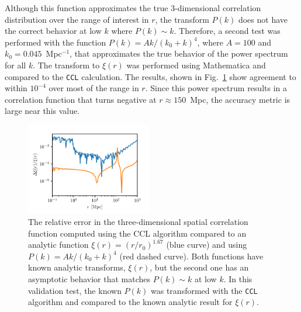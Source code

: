 \documentclass[\docopts]{\docclass}
\newcommand{\ccl}{{\tt CCL}\xspace}
\begin{document}
Although this function approximates the true 3-dimensional correlation distribution over the range of interest in $r$, the transform $P(k)$ does not have the correct behavior at low $k$ where $P(k) \sim  k$. Therefore, a second test was performed with the function $P(k) = A k / (k_0 + k)^4$, where $A = 100$ and $k_0 = 0.045$~Mpc$^{-1}$, that approximates the true behavior of the power spectrum for all $k$.
The transform to $\xi(r)$ was performed using Mathematica and compared to the \ccl calculation. The results, shown in Fig.~\ref{fig:analytic_xi} show agreement to within $10^{-4}$ over most of the range in $r$. Since this power spectrum results in a correlation function that turns negative at $r \approx 150$~Mpc, the accuracy metric is large near this value. 


%
\begin{figure}[htbp]
\centering
\includegraphics[width=0.49\textwidth]{3dcorr_analytic}
\caption{The relative error in the three-dimensional spatial correlation function computed using the CCL algorithm compared to an analytic function $\xi(r) = (r/r_0)^{1.67}$ (blue curve) and using $P(k) = A k / (k_0 + k)^4$ (red dashed curve). Both functions have known analytic transforms, $\xi(r)$, but the second one has an asymptotic behavior that matches $P(k)\sim k$ at low $k$. In this validation test, the known $P(k)$ was transformed with the \ccl algorithm and compared to the known analytic result for $\xi(r)$.}
\label{fig:analytic_xi}
\end{figure}

\end{document}
